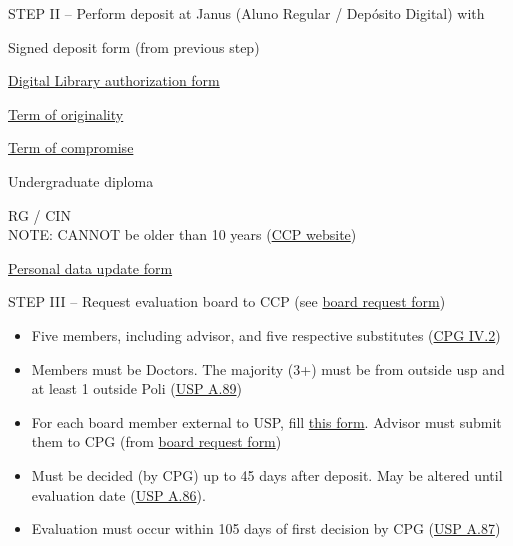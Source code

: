 \documentclass[normalnum]{politex}
\newcommand{\cmark}{\ding{51}}%
\newcommand{\done}{\rlap{$\square$}{\raisebox{2pt}{\large\hspace{1pt}\cmark}}%
\hspace{-2.5pt}}
\begin{document}
\begin{todolist}
\item[\done] STEP II -- Perform deposit at Janus (Aluno Regular / Depósito Digital) with
\begin{todolist}
  \item[\done] Signed deposit form (from previous step)
  \item[\done] \href{https://www.poli.usp.br/wp-content/uploads/2021/02/Formulario-de-autorizacao.pdf}{Digital Library authorization form}
  \item[\done] \href{https://www.poli.usp.br/wp-content/uploads/2021/02/Termo-de-originalidade-Deposito.pdf}{Term of originality}
  \item[\done] \href{https://www.poli.usp.br/wp-content/uploads/2023/11/TERMO-DE-COMPROMISSO-DE-ENTREGA-DE-EXEMPLARES-IMPRESSOS-Salvo-Automaticamente-1.pdf}{Term of compromise}
  \item[\done] Undergraduate diploma
  \item[\done] RG / CIN
  \\NOTE: CANNOT be older than 10 years (\href{https://ppgee.poli.usp.br/pb/regras-para-deposito-digital/}{CCP website})
  \item[\done] \href{https://www.poli.usp.br/wp-content/uploads/2018/10/ficha-cadastral-dados-pessoais.docx}{Personal data update form}
\end{todolist}

\item[\done] STEP III -- Request evaluation board to CCP (see \href{https://docs.google.com/forms/d/e/1FAIpQLSeHB4a1P63WxYpSeWkumORVAxbXNUYVHFVGrGOeByf7EDbdcg/viewform}{board request form})
\begin{itemize}
  \item[\done] Five members, including advisor, and five respective substitutes (\href{https://leginf.usp.br/?resolucao=resolucao-copgr-no-7612-de-21-de-fevereiro-de-2019#:~:text=IV.2}{CPG IV.2})
  \item[\done] Members must be Doctors. The majority (3+) must be from outside usp and at least 1 outside Poli (\href{https://leginf.usp.br/?resolucao=resolucao-no-7493-de-27-de-marco-de-2018#:~:text=Artigo%2089}{USP A.89})
  \item[\done] For each board member external to USP, fill \href{https://ppgee.poli.usp.br/wp-content/uploads/sites/92/2016/02/cadastro-de-professores-externos_0.doc}{this form}. Advisor must submit them to CPG (from \href{https://docs.google.com/forms/d/e/1FAIpQLSeHB4a1P63WxYpSeWkumORVAxbXNUYVHFVGrGOeByf7EDbdcg/viewform}{board request form})
  \item[\done] Must be decided (by CPG) up to 45 days after deposit. May be altered until evaluation date (\href{https://leginf.usp.br/?resolucao=resolucao-no-7493-de-27-de-marco-de-2018#:~:text=Artigo%2086}{USP A.86}).
  \item[\done] Evaluation must occur within 105 days of first decision by CPG (\href{https://leginf.usp.br/?resolucao=resolucao-no-7493-de-27-de-marco-de-2018#:~:text=Artigo%2087}{USP A.87})


\end{itemize}
\end{todolist}
\end{document}
